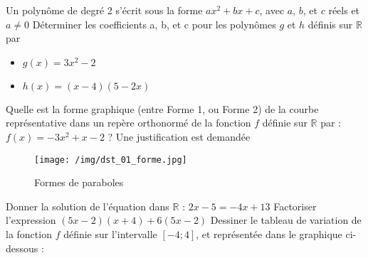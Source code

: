 \documentclass{exam}
\begin{document}
\begin{questions}
\question[1] Un polynôme de degré 2 s'écrit sous la forme $ax^2 + bx + c$, avec $a$, $b$, et $c$ réels et $a \neq 0$ Déterminer les coefficients a, b, et c pour les polynômes 
$g$ et $h$ définis sur $\mathbb{R}$ par
\begin{itemize}
  \item $g(x) = 3x^2 - 2$
  \item $h(x) = (x-4)(5-2x)$
\end{itemize}

\question[0.5] Quelle est la forme graphique (entre Forme 1, ou Forme 2) de la courbe représentative dans un repère orthonormé
de la fonction $f$ définie sur $\mathbb{R}$ par : $f(x) = -3x^2 + x - 2$ ?
Une justification est demandée

\begin{figure}[H]
  \centering
  \texttt{[image: /img/dst\_01\_forme.jpg]}
  \caption{\label{} Formes de paraboles}
\end{figure}

\question[0.5] Donner la solution de l'équation dans $\mathbb{R}$ : $2x - 5 = -4x + 13$
\question[1] Factoriser l'expression $(5x - 2)(x+4) + 6(5x -2)$
\question[1] Dessiner le tableau de variation de la fonction $f$ définie sur l'intervalle $[-4 ; 4]$, et représentée dans le graphique ci-dessous : 

 \par



\end{questions}
\end{document}
